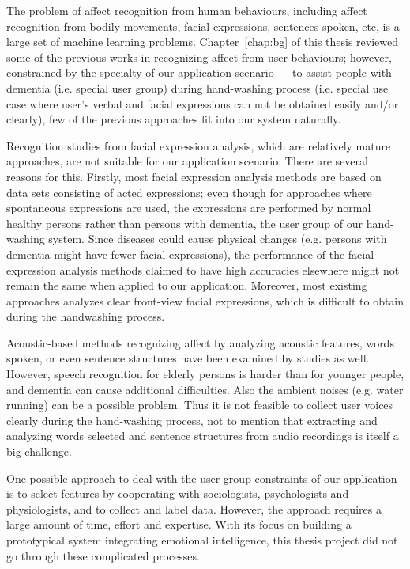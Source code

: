 The problem of affect recognition from human behaviours, including affect recognition from bodily movements, facial expressions, sentences spoken, etc, is a large set of machine learning problems. Chapter~\ref{chap:bg} of this thesis reviewed some of the previous works in recognizing affect from user behaviours; however, constrained by the specialty of our application scenario --- to assist people with dementia (i.e. special user group) during hand-washing process (i.e. special use case where user's verbal and facial expressions can not be obtained easily and/or clearly), few of the previous approaches fit into our system naturally.

Recognition studies from facial expression analysis, which are relatively mature approaches, are not suitable for our application scenario. There are several reasons for this. Firstly, most facial expression analysis methods are based on data sets consisting of acted expressions; even though for approaches where spontaneous expressions are used, the expressions are performed by normal healthy persons rather than persons with dementia, the user group of our hand-washing system. Since diseases could cause physical changes (e.g. persons with dementia might have fewer facial expressions), the performance of the facial expression analysis methods claimed to have high accuracies elsewhere might not remain the same when applied to our application. Moreover, most existing approaches analyzes clear front-view facial expressions, which is difficult to obtain during the handwashing process. 

Acoustic-based methods recognizing affect by analyzing acoustic features, words spoken, or even sentence structures have been examined by studies as well. However, speech recognition for elderly persons is harder than for younger people, and dementia can cause additional difficulties. Also the ambient noises (e.g. water running) can be a possible problem. Thus it is not feasible to collect user voices clearly during the hand-washing process, not to mention that extracting and analyzing words selected and sentence structures from audio recordings is itself a big challenge. 

One possible approach to deal with the user-group constraints of our application is to select features by cooperating with sociologists, psychologists and physiologists, and to collect and label data. However, the approach requires a large amount of time, effort and expertise. With its focus on building a prototypical system integrating emotional intelligence, this thesis project did not go through these complicated processes. 

